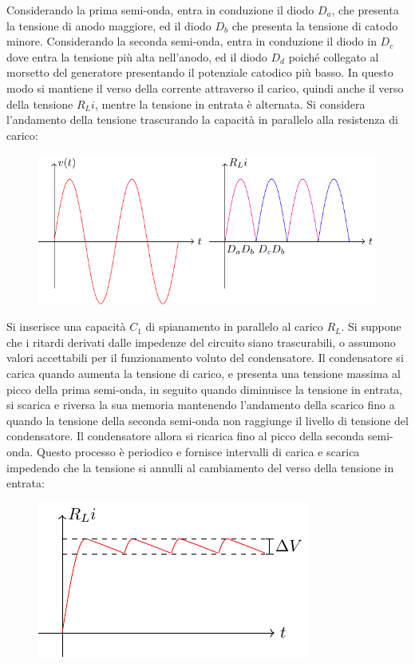 \documentclass{article}
\numberwithin{equation}{subsection}
\begin{document}
Considerando la prima semi-onda, entra in conduzione il diodo $D_a$, che presenta la tensione di anodo maggiore, ed il diodo $D_b$ che presenta la tensione di catodo minore. 
Considerando la seconda semi-onda, entra in conduzione il diodo in $D_c$ dove entra la tensione più alta nell'anodo, ed il diodo $D_d$ poiché collegato al morsetto del 
generatore presentando il potenziale catodico più basso. 
In questo modo si mantiene il verso della corrente attraverso il carico, quindi anche il verso della tensione $R_Li$, mentre la tensione in entrata è alternata. 
Si considera l'andamento della tensione trascurando la capacità in parallelo alla resistenza di carico:
\begin{figure}[H]%
    \centering
    \includegraphics{andamento-ponte-graetz.pdf}%
    \label{fig:andamento-ponte-graetz}
\end{figure}
Si inserisce una capacità $C_1$ di spianamento in parallelo al carico $R_L$. 
Si suppone che i ritardi derivati dalle impedenze del circuito siano trascurabili, o assumono valori accettabili per il funzionamento voluto del condensatore. 
Il condensatore si carica quando aumenta la tensione di carico, e presenta una tensione massima 
al picco della prima semi-onda, in seguito quando diminuisce la tensione in entrata, si scarica e riversa la sua memoria mantenendo l'andamento della scarico fino a quando la 
tensione della 
seconda semi-onda non raggiunge il livello di tensione del condensatore. Il condensatore allora si ricarica fino al picco della seconda semi-onda. Questo processo è periodico 
e fornisce intervalli di carica e scarica impedendo che la tensione si annulli al cambiamento del verso della tensione in entrata: 
\begin{figure}[H]%
    \centering
    \includegraphics{andamento-spianamento-graetz.pdf}%
    \label{fig:andamento-spianamento-graetz}
\end{figure}
\end{document}
